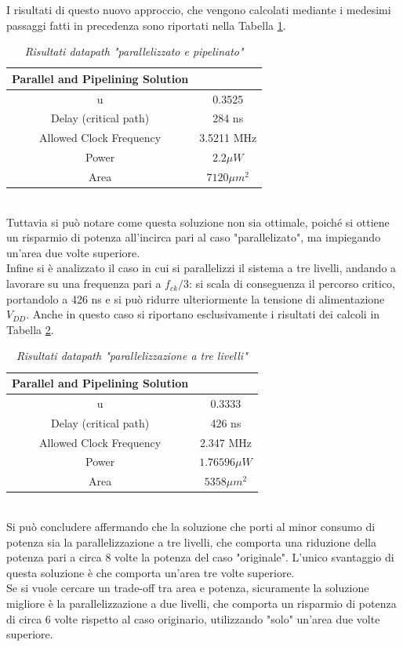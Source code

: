 I risultati di questo nuovo approccio, che vengono calcolati mediante i medesimi passaggi fatti in precedenza sono riportati nella Tabella \ref{Tab33_7}.
\begin{table}[!h]\footnotesize
	\centering
	\begin{tabular}{|c|c|}
		\hline
		\textbf{Parallel and Pipelining Solution} & \\
		\hline
		u &0.3525\\
		Delay (critical path) & 284 ns\\
		Allowed Clock Frequency & 3.5211 MHz\\
		Power & $2.2\mu W$\\
		Area & $7120 \mu m^{2}$\\
		\hline
	\end{tabular}
	\caption{\textit{Risultati datapath "parallelizzato e pipelinato"}}
	\label{Tab33_7}
\end{table}\\
Tuttavia si può notare come questa soluzione non sia ottimale, poiché si ottiene un risparmio di potenza all'incirca pari al caso "parallelizato", ma impiegando un'area due volte superiore.\\
Infine si è analizzato il caso in cui si parallelizzi il sistema a tre livelli, andando a lavorare su una frequenza pari a $f_{ck}/3$: si scala di conseguenza il percorso critico, portandolo a 426 ns e si può ridurre ulteriormente la tensione di alimentazione $V_{DD}$. Anche in questo caso si riportano esclusivamente i risultati dei calcoli in Tabella \ref{Tab33_8}. 
\begin{table}[!h]\footnotesize
	\centering
	\begin{tabular}{|c|c|}
		\hline
		\textbf{Parallel and Pipelining Solution} & \\
		\hline
		u &0.3333\\
		Delay (critical path) & 426 ns\\
		Allowed Clock Frequency & 2.347 MHz\\
		Power & $1.76596\mu W$\\
		Area & $5358 \mu m^{2}$\\
		\hline
	\end{tabular}
	\caption{\textit{Risultati datapath "parallelizzazione a tre livelli"}}
	\label{Tab33_8}
\end{table}\\
Si può concludere affermando che la soluzione che porti al minor consumo di potenza sia la parallelizzazione a tre livelli, che comporta una riduzione della potenza pari a circa 8 volte la potenza del caso "originale". L'unico svantaggio di questa soluzione è che comporta un'area tre volte superiore.\\
Se si vuole cercare un trade-off tra area e potenza, sicuramente la soluzione migliore è la parallelizzazione a due livelli, che comporta un risparmio di potenza di circa 6 volte rispetto al caso originario, utilizzando "solo" un'area due volte superiore.\\
